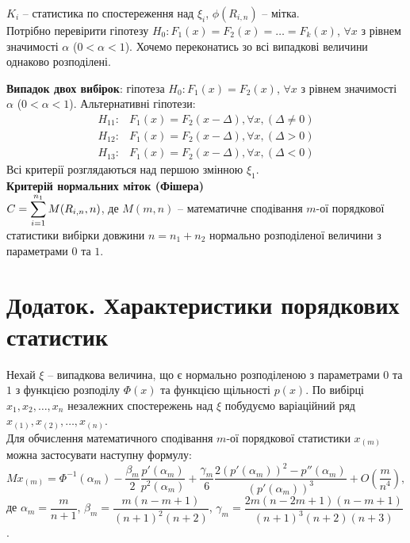$K_i$ -- статистика по спостереження над $\xi_i$, $\phi(R_{i,n})$ -- мітка. \\

Потрібно перевірити гіпотезу $H_0: F_1(x) = F_2(x) = \ldots = F_k(x)$, $\forall x$ з рівнем значимості $\alpha$ ($0 < \alpha < 1$). Хочемо переконатись зо всі випадкові величини однаково розподілені.

\textbf{Випадок двох вибірок}: гіпотеза $H_0: F_1(x) = F_2(x)$, $\forall x$ з рівнем значимості $\alpha$ ($0 < \alpha < 1$). Альтернативні гіпотези:
\begin{align*}
    H_{11}: & F_1(x) = F_2(x - \Delta), \forall x, (\Delta \ne 0) \\
    H_{12}: & F_1(x) = F_2(x - \Delta), \forall x, (\Delta > 0) \\
    H_{13}: & F_1(x) = F_2(x - \Delta), \forall x, (\Delta < 0)
\end{align*}
Всі критерії розглядаються над першою змінною $\xi_1$. \\

\textbf{Критерій нормальних міток (Фішера)} \\

$C = \displaystyle\sum\limits_{i=1}^{n_1} M(R_{i, n}, n)$, де $M(m, n)$ -- математичне сподівання $m$-ої порядкової статистики вибірки довжини $n = n_1 + n_2$ нормально розподіленої величини з параметрами $0$ та $1$. 

\section{Додаток. Характеристики порядкових статистик}

Нехай $\xi$ -- випадкова величина, що є нормально розподіленою з параметрами $0$ та $1$ з функцією розподілу $\Phi(x)$ та функцією щільності $p(x)$. По вибірці $x_1, x_2, \ldots, x_n$ незалежних спостережень над $\xi$ побудуємо варіаційний ряд $x_{(1)}, x_{(2)}, \ldots, x_{(n)}$. \\

Для обчислення математичного сподівання $m$-ої порядкової статистики $x_{(m)}$ можна застосувати наступну формулу:
\[ M x_{(m)} = \Phi^{-1}(\alpha_m) - \dfrac{\beta_m}{2} \dfrac{p'(\alpha_m)}{p^2(\alpha_m)} + \dfrac{\gamma_m}{6} \dfrac{2 (p'(\alpha_m))^2 - p''(\alpha_m)}{(p'(\alpha_m))^3} + O \left(\dfrac{m}{n^4}\right), \]
де $\alpha_m = \dfrac{m}{n + 1}$, $\beta_m = \dfrac{m(n-m+1)}{(n+1)^2(n+2)}$, $\gamma_m = \dfrac{2m(n-2m+1)(n-m+1)}{(n+1)^3(n+2)(n+3)}$. \\

